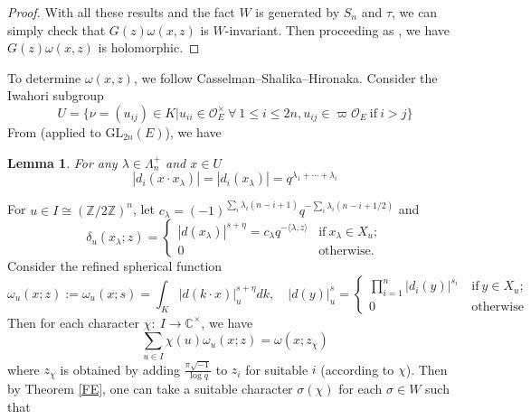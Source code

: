 \documentclass{amsart}
\newtheorem{lemma}[theorem]{Lemma}
\theoremstyle{definition}
\theoremstyle{remark}
\newcommand{\1}{\mathbf{1}}
\newcommand{\C}{\mathbb{C}}
\newcommand{\GL}{\mathrm{GL}}
\DeclareMathOperator{\diag}{diag}
\theoremstyle{definition}
\newcommand{\CO}{{\mathcal {O}}}
\newcommand{\BZ}{{\mathbb {Z}}}
\begin{document}
\begin{proof}
With all these results and the fact $W$ is generated by $S_n$ and $\tau$, we can simply check that $G(z)\omega(x,z)$ is  $W$-invariant. Then proceeding as \cite[Thm 2.6]{HK14}, we have  $G(z)\omega(x,z)$ is holomorphic.

\end{proof}
To determine $\omega(x,z)$, we follow Casselman--Shalika--Hironaka. Consider the Iwahori subgroup \[U=\{\nu=(u_{ij})\in K| u_{ii}\in\CO_E^\times\ \forall\ 1\leq i\leq 2n, u_{ij}\in\varpi\CO_E\ \text{if}\
 i>j\}\]
From \cite[Lemma 5.8]{Off04} (applied to $\GL_{2n}(E)$), we have
\begin{lemma}\label{Iwahori} For any $\lambda\in\Lambda_n^+$ and $x\in U$
\[|d_i(x\cdot x_\lambda)|=|d_i(x_\lambda)|=q^{\lambda_1+\cdots+\lambda_i}  \]
\end{lemma}
For $u\in I\cong (\BZ/2\BZ)^n$, let $ c_\lambda=(-1)^{\sum_i \lambda_i(n-i+1)}q^{-\sum_i \lambda_i(n-i+1/2)}$ and
\[\delta_u(x_\lambda;z)=\begin{cases} |d(x_\lambda)|^{s+\eta}=c_\lambda q^{-\langle \lambda,z\rangle} & \text{if}\ x_\lambda\in X_u;\\
0 & \text{otherwise}.\end{cases}\]
Consider the refined spherical function
\[\omega_u(x;z):=\omega_u(x;s)=\int_K|d(k\cdot x)|_u^{s+\eta}dk,\quad  |d(y)|_u^s=\begin{cases} \prod_{i=1}^n|d_i(y)|^{s_i}\ &\text{if}\ y\in X_u;\\
0 & \text{otherwise}\end{cases}\]
Then for each character $\chi:\ I\to\C^\times$, we have 
\[\sum_{u\in I}\chi(u)\omega_u(x;z)=\omega(x;z_\chi)\]
where $z_\chi$ is obtained by adding $\frac{\pi\sqrt{-1}}{\log q}$ to $z_i$ for suitable $i$ (according to $\chi$). Then by Theorem \ref{FE}, one can take a suitable character $\sigma(\chi)$ for each $\sigma\in W$ such that
\end{document}

